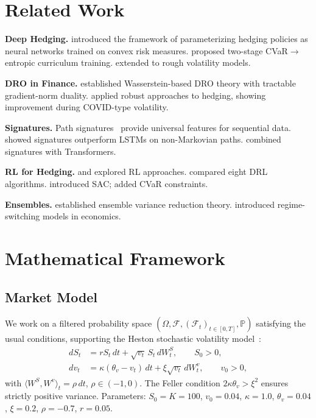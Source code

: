 \documentclass[11pt]{article}
\newcommand{\F}{\mathcal{F}}
\newcommand{\PP}{\mathbb{P}}
\begin{document}
\section{Related Work}
\label{sec:related}

\textbf{Deep Hedging.} \citet{buehler2019deep} introduced the framework of parameterizing hedging policies as neural networks trained on convex risk measures. \citet{kozyra2019deep} proposed two-stage CVaR$\to$entropic curriculum training. \citet{horvath2021deep} extended to rough volatility models.

\textbf{DRO in Finance.} \citet{blanchet2019quantifying} established Wasserstein-based DRO theory with tractable gradient-norm duality. \citet{lutkebohmert2019robust} applied robust approaches to hedging, showing improvement during COVID-type volatility.

\textbf{Signatures.} Path signatures~\citep{lyons1998differential} provide universal features for sequential data. \citet{abijaber2023hedging} showed signatures outperform LSTMs on non-Markovian paths. \citet{tong2023sigformer} combined signatures with Transformers.

\textbf{RL for Hedging.} \citet{kolm2019dynamic} and \citet{cao2021deep} explored RL approaches. \citet{neagu2025drl} compared eight DRL algorithms. \citet{haarnoja2018soft} introduced SAC; \citet{huang2025sac} added CVaR constraints.

\textbf{Ensembles.} \citet{dietterich2000ensemble} established ensemble variance reduction theory. \citet{hamilton1989new} introduced regime-switching models in economics.

\section{Mathematical Framework}
\label{sec:math}

\subsection{Market Model}

We work on a filtered probability space $(\Omega, \F, (\F_t)_{t\in[0,T]}, \PP)$ satisfying the usual conditions, supporting the Heston stochastic volatility model~\citep{heston1993closed}:
\begin{align}
    dS_t &= r S_t \, dt + \sqrt{v_t}\, S_t \, dW_t^S, \qquad S_0 > 0, \label{eq:heston_s} \\
    dv_t &= \kappa(\theta_v - v_t) \, dt + \xi \sqrt{v_t} \, dW_t^v, \qquad v_0 > 0, \label{eq:heston_v}
\end{align}
with $\langle W^S, W^v \rangle_t = \rho \, dt$, $\rho \in (-1,0)$.  The Feller condition $2\kappa\theta_v > \xi^2$ ensures strictly positive variance.  Parameters: $S_0 = K = 100$, $v_0 = 0.04$, $\kappa = 1.0$, $\theta_v = 0.04$, $\xi = 0.2$, $\rho = -0.7$, $r = 0.05$.
\end{document}

